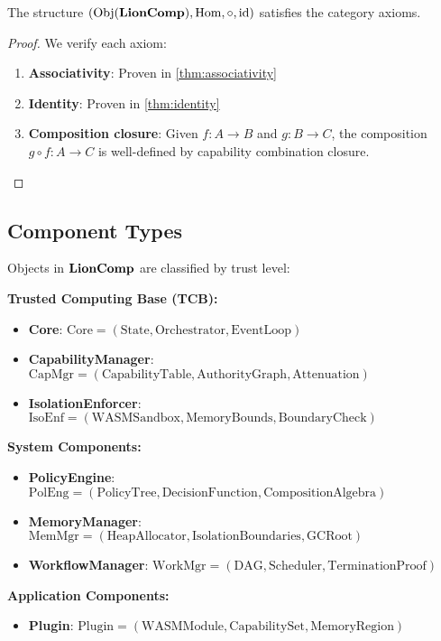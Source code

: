 \begin{lemma}
The structure $(\mathrm{Obj}(\mathbf{LionComp}), \mathrm{Hom}, \circ, \mathrm{id})$ satisfies the category axioms.
\end{lemma}

\begin{proof}
We verify each axiom:
\begin{enumerate}
\item \textbf{Associativity}: Proven in \cref{thm:associativity}
\item \textbf{Identity}: Proven in \cref{thm:identity}
\item \textbf{Composition closure}: Given $f: A \to B$ and $g: B \to C$, the composition $g \circ f: A \to C$ is well-defined by capability combination closure.
\end{enumerate}
\end{proof}

\subsection{Component Types}

\begin{definition}
Objects in $\mathbf{LionComp}$ are classified by trust level:

\textbf{Trusted Computing Base (TCB):}
\begin{itemize}
\item \textbf{Core}: $\text{Core} = (\text{State}, \text{Orchestrator}, \text{EventLoop})$
\item \textbf{CapabilityManager}: $\text{CapMgr} = (\text{CapabilityTable}, \text{AuthorityGraph}, \text{Attenuation})$
\item \textbf{IsolationEnforcer}: $\text{IsoEnf} = (\text{WASMSandbox}, \text{MemoryBounds}, \text{BoundaryCheck})$
\end{itemize}

\textbf{System Components:}
\begin{itemize}
\item \textbf{PolicyEngine}: $\text{PolEng} = (\text{PolicyTree}, \text{DecisionFunction}, \text{CompositionAlgebra})$
\item \textbf{MemoryManager}: $\text{MemMgr} = (\text{HeapAllocator}, \text{IsolationBoundaries}, \text{GCRoot})$
\item \textbf{WorkflowManager}: $\text{WorkMgr} = (\text{DAG}, \text{Scheduler}, \text{TerminationProof})$
\end{itemize}

\textbf{Application Components:}
\begin{itemize}
\item \textbf{Plugin}: $\text{Plugin} = (\text{WASMModule}, \text{CapabilitySet}, \text{MemoryRegion})$
\end{itemize}
\end{definition}

